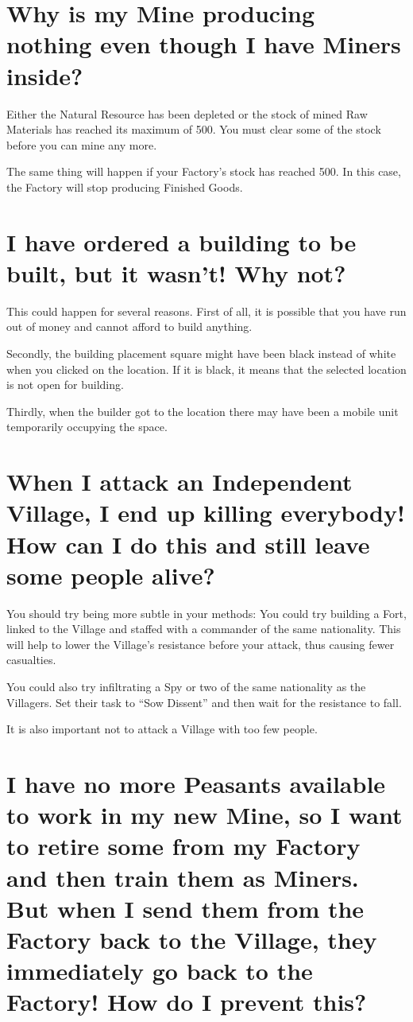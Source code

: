 \section{Why is my Mine producing nothing even though I have Miners inside?}

Either the Natural Resource has been depleted or the stock of mined Raw Materials has reached its maximum of 500. You must clear some of the stock before you can mine any more.

The same thing will happen if your Factory’s stock has reached 500. In this case, the Factory will stop producing Finished Goods.

\section{I have ordered a building to be built, but it wasn’t! Why not?}

This could happen for several reasons. First of all, it is possible that you have run out of money and cannot afford to build anything.

Secondly, the building placement square might have been black instead of white when you clicked on the location. If it is black, it means that the selected location is not open for building.


Thirdly, when the builder got to the location there may have been a mobile unit temporarily occupying the space.

\section{When I attack an Independent Village, I end up killing everybody! How can I do this and still leave some people alive?}

You should try being more subtle in your methods: You could try building a Fort, linked to the Village and staffed with a commander of the same nationality. This will help to lower the Village’s resistance before your attack, thus causing fewer casualties.

You could also try infiltrating a Spy or two of the same nationality as the Villagers. Set their task to “Sow Dissent” and then wait for the resistance to fall.

It is also important not to attack a Village with too few people.

\section{I have no more Peasants available to work in my new Mine, so I want to retire some from my Factory and then train them as Miners. But when I send them from the Factory back to the Village, they immediately go back to the Factory! How do I prevent this?}

